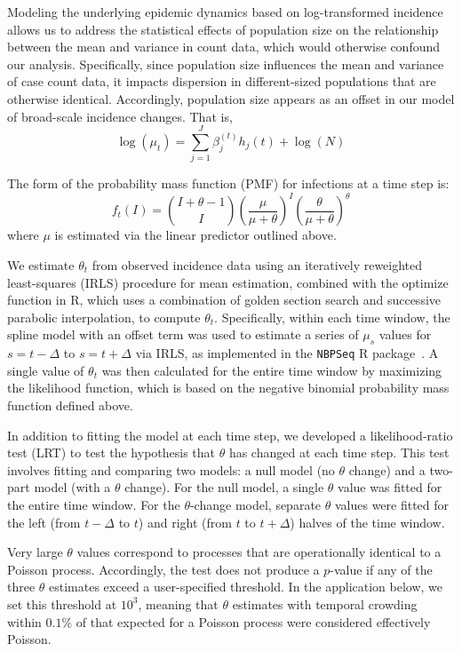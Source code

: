 \documentclass[11pt,letterpaper]{article}
\begin{document}
Modeling the underlying epidemic dynamics based on log-transformed incidence allows us to address the statistical effects of population size on the relationship between the mean and variance in count data, which would otherwise confound our analysis.
Specifically, since population size influences the mean and variance of case count data, it impacts dispersion in different-sized populations that are otherwise identical.
Accordingly, population size appears as an offset in our model of broad-scale incidence changes. That is,
\begin{equation}
  \log(\mu_t) = \sum_{j=1}^J \beta_j^{(t)} h_j(t) + \log(N) 
\end{equation}

The form of the probability mass function (PMF) for infections at a time step is:
\begin{equation}
  f_t(I) = \binom{I + \theta - 1}{I} {\left( \frac{\mu}{\mu + \theta} \right)}^I {\left( \frac{\theta}{\mu + \theta} \right)}^\theta
\end{equation}
where $\mu$ is estimated via the linear predictor outlined above. 

We estimate $\theta_t$ from observed incidence data using an iteratively reweighted least-squares (IRLS) procedure for mean estimation, combined with the optimize function in R, which uses a combination of golden section search and successive parabolic interpolation, to compute $\theta_t$. 
Specifically, within each time window, the spline model with an offset term was used to estimate a series of $\mu_s$ values for $s = t-\Delta$ to $s = t + \Delta$ via IRLS, as implemented in the \texttt{NBPSeq} R package~\citep{di2015nbpseq}. 
A single value of $\theta_t$ was then calculated for the entire time window by maximizing the likelihood function, which is based on the negative binomial probability mass function defined above.

In addition to fitting the model at each time step, we developed a likelihood-ratio test (LRT) to test the hypothesis that $\theta$ has changed at each time step. 
This test involves fitting and comparing two models: a null model (no $\theta$ change) and a two-part model (with a $\theta$ change). 
For the null model, a single $\theta$ value was fitted for the entire time window. 
For the $\theta$-change model, separate $\theta$ values were fitted for the left (from $t-\Delta$ to $t$) and right (from $t$ to $t + \Delta$) halves of the time window.

Very large $\theta$ values correspond to processes that are operationally identical to a Poisson process. 
Accordingly, the test does not produce a $p$-value if any of the three $\theta$ estimates exceed a user-specified threshold. 
In the application below, we set this threshold at $10^3$, meaning that $\theta$ estimates with temporal crowding within $0.1\%$ of that expected for a Poisson process were considered effectively Poisson.
\end{document}
